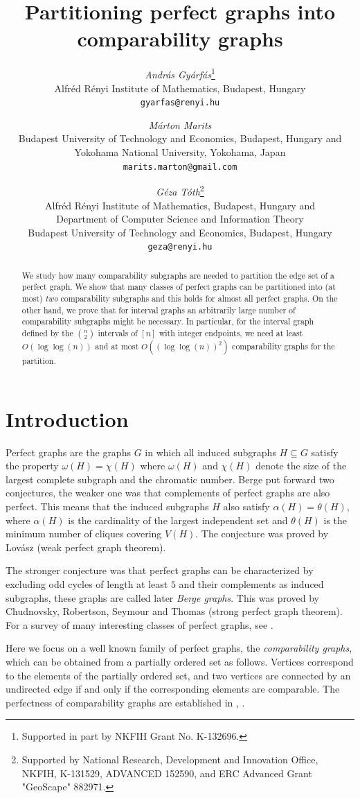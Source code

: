 \documentclass[12pt]{article}
\title{Partitioning perfect graphs into comparability graphs}
\author{
{\sl Andr\'as Gy\'arf\'as}\thanks{Supported in part by NKFIH Grant No. K-132696.}\\
\small Alfréd R\'enyi Institute of Mathematics, Budapest, Hungary \\
\texttt{gyarfas@renyi.hu}
\and
{\sl M\'arton Marits}\\
\small Budapest University of Technology and Economics, Budapest, Hungary and \\
\small Yokohama National University, Yokohama, Japan \\
\texttt{marits.marton@gmail.com}
\and
{\sl G\'eza T\'oth}\thanks{Supported by National Research, Development and Innovation Office, NKFIH,
K-131529, ADVANCED 152590, and ERC Advanced Grant "GeoScape" 882971.}\\
\small Alfréd R\'enyi Institute of Mathematics, Budapest, Hungary and\\
\small Department of Computer Science and Information Theory\\
\small Budapest University of Technology and Economics, Budapest, Hungary\\
\texttt{geza@renyi.hu}}
\begin{document}
\maketitle

\begin{abstract} We study how many comparability subgraphs are needed to partition
  the edge set of a perfect graph. We show that many classes of perfect graphs can be partitioned
  into (at most) {\em two} comparability subgraphs and this holds for almost all perfect graphs.
  On the other hand, we prove that for interval graphs
  an arbitrarily large number of  comparability subgraphs might be necessary. In particular, for the interval graph defined by the  ${n\choose 2}$ intervals of $[n]$ with integer endpoints, we need at least
  $O(\log\log(n))$ and at most  $O((\log\log(n))^2)$ comparability graphs for the partition.
  \end{abstract}

\section{Introduction}

Perfect graphs are the graphs $G$ in which all induced subgraphs $H\subseteq G$
satisfy the property $\omega(H)=\chi(H)$ where $\omega(H)$ and $\chi(H)$ denote
the size of the largest complete subgraph and the chromatic number.
Berge put forward two conjectures, the weaker one was that complements of
perfect graphs are also perfect. This means that the induced subgraphs $H$ also satisfy $\alpha(H)=\theta(H)$,
where $\alpha(H)$ is the cardinality of the largest independent set and $\theta(H)$ is the minimum number of cliques covering $V(H)$.
The conjecture was proved by Lov\'asz \cite{LO} (weak perfect graph theorem).



The stronger conjecture was that perfect graphs can be characterized by excluding odd cycles of length at least $5$
and their complements as induced subgraphs, these graphs are called later {\em Berge graphs}.
This was proved by Chudnovsky, Robertson, Seymour and Thomas \cite{CRST}
(strong perfect graph theorem).
For a survey of many interesting classes of perfect graphs, see \cite{H}.


Here we focus on a well known family of perfect graphs, the {\em comparability graphs},
which can be obtained from a partially ordered set as follows.
Vertices correspond to the elements of the partially ordered set,
and two vertices are connected by an undirected edge if and only if the corresponding elements
are comparable. The perfectness of comparability graphs are established in \cite{D50}, \cite{M71}.
\end{document}
